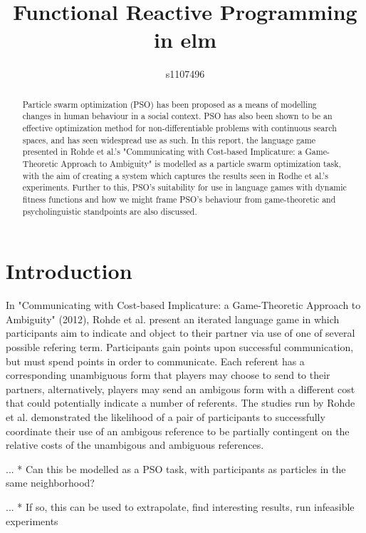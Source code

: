 \documentclass[12pt]{article}
\begin{document}
\title{Functional Reactive Programming in elm}
\author{s1107496}

\maketitle

\begin{abstract}
Particle swarm optimization (PSO) has been proposed as a means of modelling changes in human behaviour in a social context. PSO has also been shown to be an effective optimization method for non-differentiable problems with continuous search spaces, and has seen widespread use as such. In this report, the language game presented in Rohde et al.'s "Communicating with Cost-based Implicature: a Game-Theoretic Approach to Ambiguity" is modelled as a particle swarm optimization task, with the aim of creating a system which captures the results seen in Rodhe et al.'s experiments. Further to this, PSO's suitability for use in language games with dynamic fitness functions and how we might frame PSO's behaviour from game-theoretic and psycholinguistic standpoints are also discussed.
\end{abstract}



\section{Introduction}
In "Communicating with Cost-based Implicature: a Game-Theoretic Approach to Ambiguity" (2012), Rohde et al. present an iterated language game in which participants aim to indicate and object to their partner via use of one of several possible refering term. Participants gain points upon successful communication, but must spend points in order to communicate. Each referent has a corresponding unambiguous form that players may choose to send to
their partners, alternatively, players may send an ambigous form with a different cost that could potentially indicate a number of referents. The 
studies run by Rohde et al. demonstrated the likelihood of a pair of participants to successfully coordinate their use of an ambigous reference to be partially contingent on the relative costs of the unambigous and ambiguous references.

... * Can this be modelled as a PSO task, with participants as particles in the same neighborhood?

... * If so, this can be used to extrapolate, find interesting results, run infeasible experiments
\end{document}
